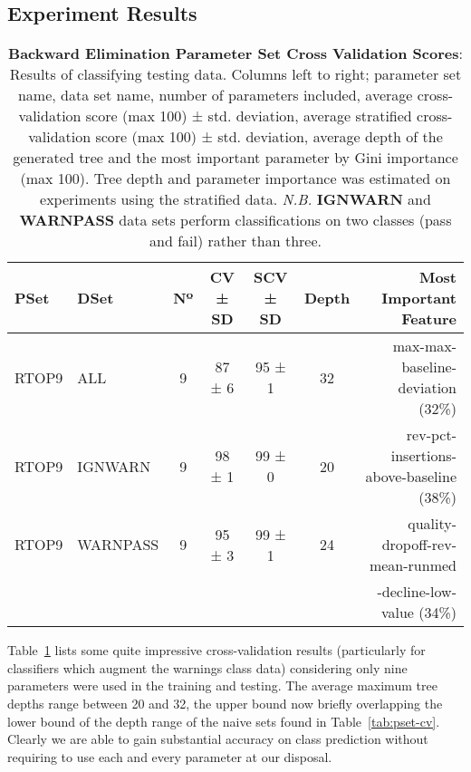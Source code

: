 \subsection{Experiment Results}

\begin{table}[H]
    \centering
    \begin{tabular}{l l | c  c  c  c  r}
        PSet & DSet          & Nº & CV ± SD & SCV ± SD & Depth & Most Important Feature\\
        \hline
        RTOP9 & ALL         & 9  & 87 ± 6  & 95 ± 1 & 32 & max-max-baseline-deviation (32\%)\\
        RTOP9 & IGNWARN     & 9  & 98 ± 1  & 99 ± 0 & 20 & rev-pct-insertions-above-baseline (38\%)\\
        RTOP9 & WARNPASS    & 9 & 95 ± 3 & 99 ± 1 & 24 &
                                                    quality-dropoff-rev-mean-runmed\\
                                                    &&&&&&-decline-low-value (34\%)\\
    \end{tabular}

    \caption[be-pset-cv]{\textbf{Backward Elimination Parameter Set Cross Validation Scores}:
        Results of classifying testing data.
        Columns left to right; parameter set name, data set name, number of parameters
        included, average cross-validation score (max 100) ± std. deviation,
        average stratified cross-validation score (max 100) ± std. deviation,
        average depth of the generated tree and the most important parameter by
        Gini importance (max 100). Tree depth and parameter importance was
        estimated on experiments using the stratified data. \textit{N.B.}
        \textbf{IGNWARN} and \textbf{WARNPASS} data sets perform classifications on
        two classes (pass and fail) rather than three.}
    \label{tab:be-pset-cv}
\end{table}

Table~\ref{tab:be-pset-cv} lists some quite impressive cross-validation results
(particularly for classifiers which augment the warnings class data) considering
only nine parameters were used in the training and testing.  The average maximum
tree depths range between 20 and 32, the upper bound now briefly overlapping the
lower bound of the depth range of the naive sets found in
Table~\ref{tab:pset-cv}. Clearly we are able to gain substantial accuracy on
class prediction without requiring to use each and every parameter at our
disposal.


